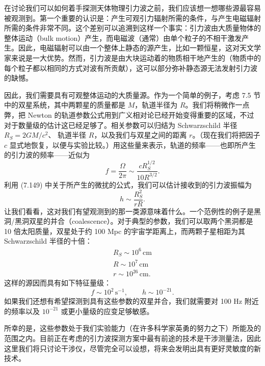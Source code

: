 在讨论我们可以如何着手探测天体物理引力波之前，我们应该想一想哪些源最容易被观测到。第一个重要的认识是：产生可观引力辐射所需的条件，与产生电磁辐射所需的条件非常不同。这个差别可以追溯到这样一个事实：引力波由大质量物体的整体运动（bulk motion）产生，而电磁波（通常）由单个粒子的不相干激发产生。因此，电磁辐射可以由一个整体上静态的源产生，比如一颗恒星，这对天文学家来说是一大优势。然而，引力波是由大块运动着的物质相干地产生的（物质中的每个粒子都以相同的方式对波有所贡献），这可以部分弥补静态源无法发射引力波的缺憾。

因此，我们需要具有可观整体运动的大质量源。作为一个简单的例子，考虑 7.5 节中的双星系统，其中两颗星的质量都是 $M$，轨道半径为 $R$。我们将稍微作一点弊，把 Newton 的轨道参数公式用到广义相对论已经开始变得重要的区域，不过对于数量级的估计这已经足够了。相关参数可以归结为 Schwarzschild 半径 $R_S = 2GM/c^2$、
轨道半径 $R$，以及我们与双星之间的距离 $r$。（现在我们将把因子 $c$ 显式地恢复，以便与实验比较。）用这些量来表示，轨道的频率——也即所产生的引力波的频率——近似为
\begin{equation*}
f = \frac{\Omega}{2\pi} \sim \frac{cR_S^{1/2}}{10R^{3/2}}.
\tag{7.194}
\end{equation*}
利用 (7.149) 中关于所产生的微扰的公式，我们可以估计接收到的引力波振幅为
\begin{equation*}
h \sim \frac{R_S^2}{rR}.
\tag{7.195}
\end{equation*}
让我们看看，这对我们有望观测到的那一类源意味着什么。一个范例性的例子是黑洞/黑洞双星的并合（coalescence）。对于典型的参数，我们可以取两个黑洞都是 10 倍太阳质量，双星处于约 100 Mpc 的宇宙学距离上，而两颗子星相距为其 Schwarzschild 半径的十倍：
\begin{gather*}
R_S \sim 10^6\,\mathrm{cm}\\
R \sim 10^7\,\mathrm{cm}\\
r \sim 10^{26}\,\mathrm{cm}.
\tag{7.196}
\end{gather*}
这样的源因而具有如下特征量级：
\begin{equation*}
f \sim 10^2\,\mathrm{s}^{-1}, \qquad h \sim 10^{-21}.
\tag{7.197}
\end{equation*}
如果我们还想有希望探测到具有这些参数的双星并合，我们就需要对 100 Hz 附近的频率以及 $10^{-21}$ 或更小量级的应变足够敏感。

所幸的是，这些参数处于我们实验能力（在许多科学家英勇的努力之下）所能及的范围之内。目前正在考虑的引力波探测方案中最有前途的技术是干涉测量法，因此这里我们将只讨论干涉仪，尽管完全可以设想，将来会发明出具有更好灵敏度的新技术。

